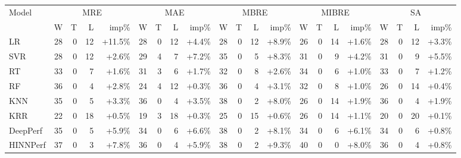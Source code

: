 \begin{tabular}{lrrrrrrrrrrrrrrrrrrrr}
\toprule
Model & \multicolumn{4}{c}{MRE} & \multicolumn{4}{c}{MAE} & \multicolumn{4}{c}{MBRE} & \multicolumn{4}{c}{MIBRE} & \multicolumn{4}{c}{SA} \\
& W & T & L & imp\% & W & T & L & imp\% & W & T & L & imp\% & W & T & L & imp\% & W & T & L & imp\% \\
\midrule
LR & 28 & 0 & 12 & +11.5\% & 28 & 0 & 12 & +4.4\% & 28 & 0 & 12 & +8.9\% & 26 & 0 & 14 & +1.6\% & 28 & 0 & 12 & +3.3\% \\
SVR & 28 & 0 & 12 & +2.6\% & 29 & 4 & 7 & +7.2\% & 35 & 0 & 5 & +8.3\% & 31 & 0 & 9 & +4.2\% & 31 & 0 & 9 & +5.5\% \\
RT & 33 & 0 & 7 & +1.6\% & 31 & 3 & 6 & +1.7\% & 32 & 0 & 8 & +2.6\% & 34 & 0 & 6 & +1.0\% & 33 & 0 & 7 & +1.2\% \\
RF & 36 & 0 & 4 & +2.8\% & 24 & 4 & 12 & +0.3\% & 36 & 0 & 4 & +3.1\% & 32 & 0 & 8 & +1.0\% & 26 & 0 & 14 & +0.4\% \\
KNN & 35 & 0 & 5 & +3.3\% & 36 & 0 & 4 & +3.5\% & 38 & 0 & 2 & +8.0\% & 26 & 0 & 14 & +1.9\% & 36 & 0 & 4 & +1.9\% \\
KRR & 22 & 0 & 18 & +0.5\% & 19 & 3 & 18 & +0.3\% & 25 & 0 & 15 & +0.6\% & 26 & 0 & 14 & +1.1\% & 20 & 0 & 20 & +0.1\% \\
DeepPerf & 35 & 0 & 5 & +5.9\% & 34 & 0 & 6 & +6.6\% & 38 & 0 & 2 & +8.1\% & 34 & 0 & 6 & +6.1\% & 34 & 0 & 6 & +0.8\% \\
HINNPerf & 37 & 0 & 3 & +7.8\% & 36 & 0 & 4 & +5.9\% & 38 & 0 & 2 & +9.3\% & 40 & 0 & 0 & +8.0\% & 36 & 0 & 4 & +0.8\% \\
\bottomrule
\end{tabular}
